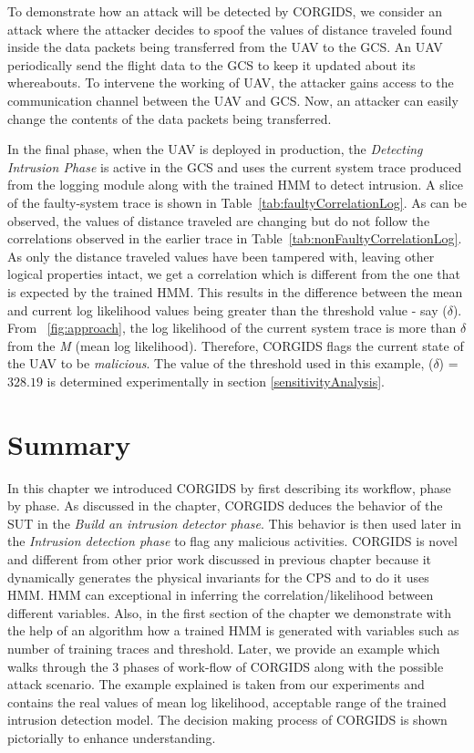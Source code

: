 To demonstrate how an attack will be detected by \ac{CORGIDS}, we consider an attack where the attacker decides to spoof the values of distance traveled found inside the data packets being transferred from the \ac{UAV} to the \ac{GCS}. An \ac{UAV} periodically send the flight data to the \ac{GCS} to keep it updated about its whereabouts. To intervene the working of \ac{UAV}, the attacker gains access to the communication channel between the \ac{UAV} and \ac{GCS}. Now, an attacker can easily change the contents of the data packets being transferred.

In the final phase, when the \ac{UAV} is deployed in production, the \textit{Detecting Intrusion Phase} is active in the \ac{GCS} and uses the current system trace produced from the logging module along with the trained HMM to detect intrusion. A slice of the faulty-system trace is shown in Table~\ref{tab:faultyCorrelationLog}. As can be observed, the values of distance traveled are changing but do not follow the correlations observed in the earlier trace in Table~\ref{tab:nonFaultyCorrelationLog}. As only the distance traveled values have been tampered with, leaving other logical properties intact, we get a correlation which is different from the one that is expected by the trained \ac{HMM}. This results in the difference between the mean and current log likelihood values being greater than the threshold value - say ($\delta$). From ~\autoref{fig:approach}, the log likelihood of the current system trace is more than $\delta$ from the \textit{M} (mean log likelihood). Therefore, \ac{CORGIDS} flags the current state of the \ac{UAV} to be \textit{malicious}. The value of the threshold used in this example, ($\delta$) = $328.19$ is determined experimentally in section \ref{sensitivityAnalysis}. 

\section{Summary}
In this chapter we introduced \ac{CORGIDS} by first describing its workflow, phase by phase. As discussed in the chapter, \ac{CORGIDS} deduces the behavior of the \ac{SUT} in the \textit{Build an intrusion detector phase}. This behavior is then used later in the \textit{Intrusion detection phase} to flag any malicious activities. \ac{CORGIDS} is novel and different from other prior work discussed in previous chapter because it dynamically generates the physical invariants for the \ac{CPS} and to do it uses \ac{HMM}. \ac{HMM} can exceptional in inferring the correlation/likelihood between different variables. Also, in the first section of the chapter we demonstrate with the help of an algorithm how a trained \ac{HMM} is generated with variables such as number of training traces and threshold. Later, we provide an example which walks through the 3 phases of work-flow of \ac{CORGIDS} along with the possible attack scenario. The example explained is taken from our experiments and contains the real values of mean log likelihood, acceptable range of the trained intrusion detection model. The decision making process of \ac{CORGIDS} is shown pictorially to enhance understanding.

\endinput
=====================================================================
